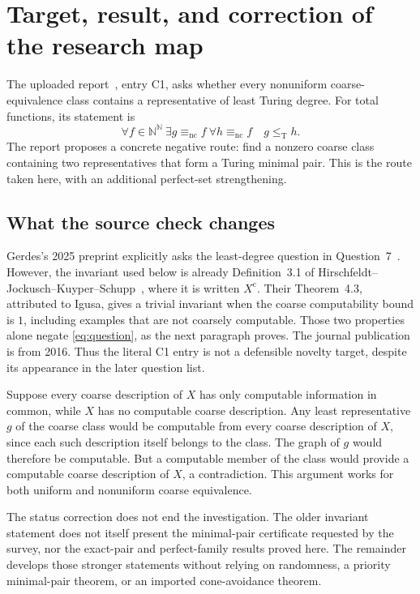 \documentclass[11pt,a4paper]{article}
\newcommand{\N}{\mathbb N}
\newcommand{\Baire}{\N^{\N}}
\newcommand{\leT}{\leq_{\mathrm T}}
\newcommand{\nc}{\mathrm{nc}}
\theoremstyle{definition}\newtheorem{definition}[theorem]{Definition}
\theoremstyle{remark}\newtheorem{remark}[theorem]{Remark}
\begin{document}
\section{Target, result, and correction of the research map}
\label{sec:target}
The uploaded report~\cite{Survey}, entry C1, asks whether every nonuniform
coarse-equivalence class contains a representative of least Turing degree.
For total functions, its statement is
\begin{equation}\label{eq:question}
 \forall f\in\Baire\ \exists g\equiv_{\nc}f\
 \forall h\equiv_{\nc}f\quad g\leT h.
\end{equation}
The report proposes a concrete negative route: find a nonzero coarse class
containing two representatives that form a Turing minimal pair. This is the
route taken here, with an additional perfect-set strengthening.

\subsection{What the source check changes}
Gerdes's 2025 preprint explicitly asks the least-degree question in
Question~7~\cite{Gerdes}. However, the invariant used below is already
Definition~3.1 of Hirschfeldt--Jockusch--Kuyper--Schupp~\cite{HJKS}, where it is
written $X^{\mathrm c}$. Their Theorem~4.3, attributed to Igusa, gives a trivial
invariant when the coarse computability bound is $1$, including examples that
are not coarsely computable. Those two properties alone negate
\eqref{eq:question}, as the next paragraph proves. The journal publication is
from 2016. Thus the literal C1 entry is not a defensible novelty target,
despite its appearance in the later question list.

Suppose every coarse description of $X$ has only computable information in
common, while $X$ has no computable coarse description. Any least
representative $g$ of the coarse class would be computable from every coarse
description of $X$, since each such description itself belongs to the class.
The graph of $g$ would therefore be computable. But a computable member of the
class would provide a computable coarse description of $X$, a contradiction.
This argument works for both uniform and nonuniform coarse equivalence.

The status correction does not end the investigation. The older invariant
statement does not itself present the minimal-pair certificate requested by
the survey, nor the exact-pair and perfect-family results proved here. The
remainder develops those stronger statements without relying on randomness,
a priority minimal-pair theorem, or an imported cone-avoidance theorem.
\end{document}
